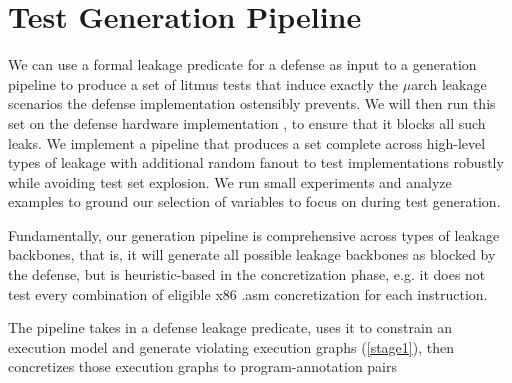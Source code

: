 
\section{Test Generation Pipeline}
We can use a formal leakage predicate for a defense as input to a generation pipeline to produce a set of litmus tests that induce exactly the $\mu$arch leakage scenarios the defense implementation ostensibly prevents. We will then run this set on the defense hardware implementation , to ensure that it blocks all such leaks. We implement a pipeline that produces a set complete across high-level types of leakage with additional random fanout to test implementations robustly while avoiding test set explosion. We  run small experiments and analyze examples to ground our selection of variables to focus on during test generation. 


Fundamentally, our generation pipeline is comprehensive across types of leakage backbones, that is, it will generate all possible leakage backbones as blocked by the defense, but is heuristic-based in the concretization phase, e.g. it does not test every combination of eligible x86 .asm concretization for each instruction. 

The pipeline takes in a defense leakage predicate,  uses it to constrain an execution model and generate violating execution graphs (\ref{stage1}), then concretizes those execution graphs to program-annotation pairs
\urgentbr
{}
\notebr


